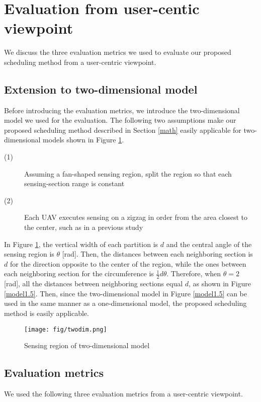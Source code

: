 \documentclass{ieeeaccess}
\begin{document}
\section{Evaluation from user-centic viewpoint}
We discuss the three evaluation metrics we used to evaluate our proposed scheduling method from a user-centric viewpoint.

\subsection{Extension to two-dimensional model}\label{twodi}
Before introducing the evaluation metrics, we introduce the two-dimensional model we used for the evaluation.
The following two assumptions make our proposed scheduling method described in Section \ref{math} easily applicable for two-dimensional models shown in Figure \ref{twodimention}.

\begin{description}

\item[(1)]  Assuming a fan-shaped sensing region, split the region so that each sensing-section range is constant
\item[(2)] Each UAV executes sensing on a zigzag in order from the area closest to the center, such as in a previous study \cite{Maza2007}
\end{description}

In Figure \ref{twodimention}, the vertical width of each partition is $d$ and the central angle of the sensing region is $\theta$ [rad].
Then, the distances between each neighboring section is $d$ for the direction opposite to the center of the region, while the ones between each neighboring section for the circumference is $\frac{1}{2}d\theta$.
Therefore, when $\theta=2$ [rad], all the distances between neighboring sections equal $d$, as shown in Figure \ref{model1.5}. Then, since the two-dimensional model in Figure \ref{model1.5} can be used in the  same manner as a one-dimensional model, the proposed scheduling method is easily applicable.
\begin{figure}[t]
\begin{center}
\texttt{[image: fig/twodim.png]}
\caption{Sensing region of two-dimensional model}
\label{twodimention}
\end{center}
\end{figure}

\subsection{Evaluation metrics}\label{compare}
We used the following three evaluation metrics from a user-centric viewpoint.
\end{document}
